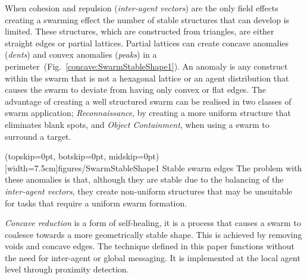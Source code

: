 \documentclass{ieeeaccess}
\begin{document}
When cohesion and repulsion (\textit{inter-agent vectors}) are the only field effects creating a swarming effect the number of stable structures that can develop is limited. These structures, which are constructed from triangles, are either straight edges or partial lattices. Partial lattices can create concave anomalies (\textit{dents}) and convex anomalies (\textit{peaks}) in a perimeter~(Fig.~\ref{concave:SwarmStableShape1}). An anomaly is any construct within the swarm that is not a hexagonal lattice or an agent distribution that causes the swarm to deviate from having only convex or flat edges. The advantage of creating a well structured swarm can be realised in two classes of swarm application; \textit{Reconnaissance}, by creating a more uniform structure that eliminates blank spots, and \textit{Object Containment}, when using a swarm to surround a target.  

\Figure[t!](topskip=0pt, botskip=0pt, midskip=0pt)[width=7.5cm]{figures/SwarmStableShape1}
{Stable swarm edges\label{concave:SwarmStableShape1}}
The problem with these anomalies is that, although they are stable due to the balancing of the \textit{inter-agent vectors}, they create non-uniform structures that may be unsuitable for tasks that require a uniform swarm formation.

\textit{Concave reduction} is a form of self-healing, it is a process that causes a swarm to coalesce towards a more geometrically stable shape. This is achieved by removing voids and concave edges. The technique defined in this paper functions without the need for inter-agent or global messaging. It is implemented at the local agent level through proximity detection.
\end{document}
